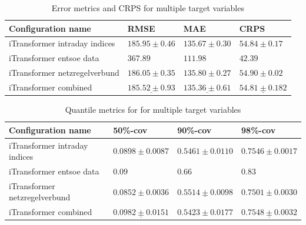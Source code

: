 \documentclass[class=scrbook, crop=false]{standalone}
\begin{document}
 \begin{table}[]
\centering
\begin{tabular}{l|l|l|l}
 Configuration name			&  RMSE 			& MAE 			& CRPS 			 \\\hline
 iTransformer intraday indices 		&$ 185.95\pm 0.46	$&$ 135.67 \pm 0.30	$&$ 54.84\pm0.17	$\\
 iTransformer entsoe data		&$  367.89			$&$ 111.98 		$&$42.39			 $\\
 iTransformer netzregelverbund 	& $186.05 \pm 0.35	$&$ 135.80\pm0.27	$&$ 54.90\pm 0.02	$\\
 iTransformer combined 		&$ \underline{185.52 \pm 0.93}	$&$ \underline{135.36\pm 0.61}	$&$ \underline{54.81\pm 0.18	2} $\\
\end{tabular}
\caption{Error metrics and CRPS for multiple target variables}
\label{Table::Performance_targets}
\end{table}
\begin{table}
\centering
\begin{tabular}{l|l|l|l}
 Configuration name			& 50\%-cov 		& 90\%-cov 		& 98\%-cov \\\hline
 iTransformer intraday indices 		&$0.0898\pm 0.0087	$& $0.5461\pm 0.0110	$ & $0.7546 \pm 0.0017$\\
 iTransformer entsoe data		&$0.09			$&$ 0.66	 		$&$0.83 $\\
 iTransformer netzregelverbund 	&$0.0852\pm 0.0036	$&$\underline{0.5514 \pm 0.0098}	$&$ 0.7501 \pm 0.0030$\\
 iTransformer combined 		&$ \underline{0.0982\pm 0.0151}	$&$ 0.5423 \pm 0.0177 	$&$ \underline{0.7548 \pm 0.0032}$\\
\end{tabular}
\caption{Quantile metrics for for  multiple target variables}
\label{Table::Performance_targets}
\end{table}
\end{document}
